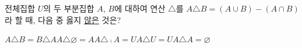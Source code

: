 전체집합 $U$의 두 부분집합 $A$, $B$에 대하여 연산 $\triangle$를 $A\triangle B=(A\cup B)-(A\cap B)$라 할 때, 다음 중 옳지 \underline{않은} 것은?
\begin{choicesii}{$A\triangle B=B\triangle A$}{$A\triangle\varnothing=A$}{$A\triangle\comp{A}=U$}{$A\triangle U=U$}{$A\triangle A=\varnothing$}\end{choicesii}
